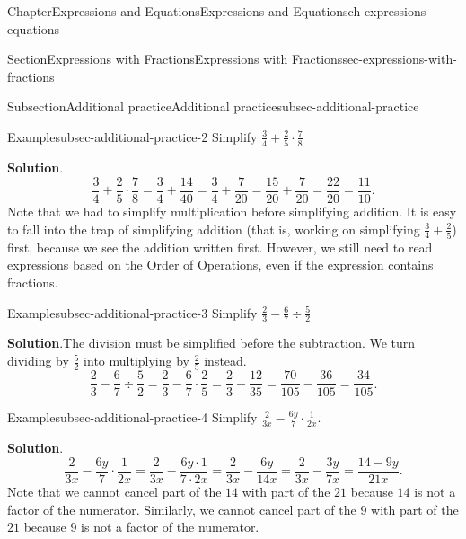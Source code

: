 \documentclass[twoside,11pt,]{book}
\newcommand{\blocktitlefont}{\relax}
\numberwithin{equation}{chapter}
\begin{document}
\begin{chapterptx}{Chapter}{Expressions and Equations}{}{Expressions and Equations}{}{}{ch-expressions-equations}
\begin{sectionptx}{Section}{Expressions with Fractions}{}{Expressions with Fractions}{}{}{sec-expressions-with-fractions}
%
\begin{subsectionptx}{Subsection}{Additional practice}{}{Additional practice}{}{}{subsec-additional-practice}
\begin{example}{Example}{}{subsec-additional-practice-2}%
Simplify \(\frac{3}{4} + \frac{2}{5} \cdot \frac{7}{8}\)%
\par\smallskip%
\noindent\textbf{\blocktitlefont Solution}.\hypertarget{subsec-additional-practice-2-2}{}\quad{}%
\begin{equation*}
\frac{3}{4} + \frac{2}{5} \cdot \frac{7}{8} = \frac{3}{4} + \frac{14}{40} = \frac{3}{4} + \frac{7}{20} = \frac{15}{20} + \frac{7}{20} = \frac{22}{20} = \frac{11}{10}.
\end{equation*}
Note that we had to simplify multiplication before simplifying addition. It is easy to fall into the trap of simplifying addition (that is, working on simplifying \(\frac34 + \frac25\)) first, because we see the addition written first. However, we still need to read expressions based on the Order of Operations, even if the expression contains fractions.%
\end{example}
\begin{example}{Example}{}{subsec-additional-practice-3}%
Simplify \(\frac{2}{3} - \frac{6}{7} \div \frac{5}{2}\)%
\par\smallskip%
\noindent\textbf{\blocktitlefont Solution}.\hypertarget{subsec-additional-practice-3-2}{}\quad{}The division must be simplified before the subtraction. We turn dividing by \(\frac52\) into multiplying by \(\frac25\) instead.%
\begin{equation*}
\frac{2}{3} - \frac{6}{7} \div \frac{5}{2} = \frac{2}{3} - \frac{6}{7} \cdot \frac{2}{5} = \frac{2}{3} - \frac{12}{35} = \frac{70}{105} - \frac{36}{105} = \frac{34}{105}.
\end{equation*}
%
\end{example}
\begin{example}{Example}{}{subsec-additional-practice-4}%
Simplify \(\frac{2}{3x} - \frac{6y}{7} \cdot \frac{1}{2x}\).%
\par\smallskip%
\noindent\textbf{\blocktitlefont Solution}.\hypertarget{subsec-additional-practice-4-2}{}\quad{}%
\begin{equation*}
\frac{2}{3x} - \frac{6y}{7} \cdot \frac{1}{2x} 
= \frac{2}{3x} - \frac{6y \cdot 1}{7 \cdot 2x} 
= \frac{2}{3x} - \frac{6y}{14x} 
= \frac{2}{3x} - \frac{3y}{7x} 
= \frac{14 - 9y}{21x}.
\end{equation*}
Note that we cannot cancel part of the \(14\) with part of the \(21\) because \(14\) is not a factor of the numerator. Similarly, we cannot cancel part of the \(9\) with part of the \(21\) because \(9\) is not a factor of the numerator.%

\end{example}
\end{subsectionptx}
\end{sectionptx}
\end{chapterptx}
\end{document}

